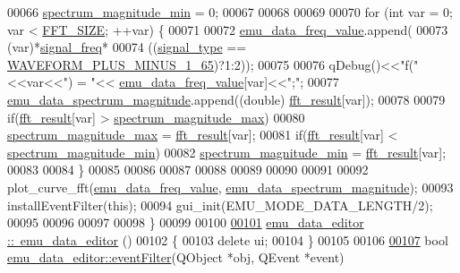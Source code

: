 \begin{DoxyCode}
00066     \hyperlink{a00004_afb692cc49c350d4bf120ca1e3dd61e93}{spectrum\_magnitude\_min} = 0;
00067 
00068 
00069 
00070     \textcolor{keywordflow}{for} (\textcolor{keywordtype}{int} var = 0; var < \hyperlink{a00036_a636ddc19af00bc87969a07c88331f105}{FFT\_SIZE}; ++var) \{
00071 
00072         \hyperlink{a00004_a62129d59e218ab857cd50cb202205129}{emu\_data\_freq\_value}.append(
00073                     (var)*\hyperlink{a00004_a67039999d520fc483fab521fae5ddde4}{signal\_freq}*
00074                     ((\hyperlink{a00004_a070edaec5aee6ba1f5a6866bc32c8ce4}{signal\_type} == \hyperlink{a00034_a0923d3b365a36e1e8c401cec964aa36f}{WAVEFORM\_PLUS\_MINUS\_1\_65})?1:2));
00075 
00076         qDebug()<<\textcolor{stringliteral}{"f("}<<var<<\textcolor{stringliteral}{") = "}<< \hyperlink{a00004_a62129d59e218ab857cd50cb202205129}{emu\_data\_freq\_value}[var]<<\textcolor{stringliteral}{";"};
00077         \hyperlink{a00004_ac3c515466f79ab8e60a58e8d15a3b991}{emu\_data\_spectrum\_magnitude}.append((\textcolor{keywordtype}{double})
      \hyperlink{a00004_a63b6150bfbba86ba943877a2f547ddd8}{fft\_result}[var]);
00078 
00079         \textcolor{keywordflow}{if}(\hyperlink{a00004_a63b6150bfbba86ba943877a2f547ddd8}{fft\_result}[var] > \hyperlink{a00004_ae0119c7dd2179cdcb3ea37adbefdc289}{spectrum\_magnitude\_max})
00080             \hyperlink{a00004_ae0119c7dd2179cdcb3ea37adbefdc289}{spectrum\_magnitude\_max} = \hyperlink{a00004_a63b6150bfbba86ba943877a2f547ddd8}{fft\_result}[var];
00081         \textcolor{keywordflow}{if}(\hyperlink{a00004_a63b6150bfbba86ba943877a2f547ddd8}{fft\_result}[var] < \hyperlink{a00004_afb692cc49c350d4bf120ca1e3dd61e93}{spectrum\_magnitude\_min})
00082             \hyperlink{a00004_afb692cc49c350d4bf120ca1e3dd61e93}{spectrum\_magnitude\_min} = \hyperlink{a00004_a63b6150bfbba86ba943877a2f547ddd8}{fft\_result}[var];
00083 
00084     \}
00085 
00086 
00087 
00088 
00089 
00090 
00091 
00092     plot\_curve\_fft(\hyperlink{a00004_a62129d59e218ab857cd50cb202205129}{emu\_data\_freq\_value},
      \hyperlink{a00004_ac3c515466f79ab8e60a58e8d15a3b991}{emu\_data\_spectrum\_magnitude});
00093     installEventFilter(\textcolor{keyword}{this});
00094     gui\_init(EMU\_MODE\_DATA\_LENGTH/2);
00095 
00096 
00097 
00098 \}
00099 
00100 
\hypertarget{a00035_source_l00101}{}\hyperlink{a00004_ab897c9d3081a980c0ad94f09d5dbce99}{00101} \hyperlink{a00004_ab897c9d3081a980c0ad94f09d5dbce99}{emu\_data\_editor ::~emu\_data\_editor} ()
00102 \{
00103     \textcolor{keyword}{delete} ui;
00104 \}
00105 
00106 
\hypertarget{a00035_source_l00107}{}\hyperlink{a00004_a48f610d23d17b2679113ea351d0968e4}{00107} \textcolor{keywordtype}{bool} \hyperlink{a00004_a48f610d23d17b2679113ea351d0968e4}{emu\_data\_editor::eventFilter}(QObject *obj, QEvent *event)

\end{DoxyCode}
